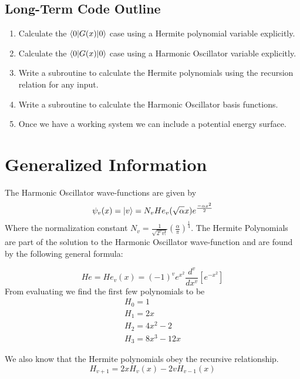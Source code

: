 \documentclass{article}
\begin{document}
 \subsection*{Long-Term Code Outline}
\begin{enumerate}
    \item Calculate the $\braket{0|G(x)|0}$ case using a Hermite polynomial variable explicitly.
    \item Calculate the $\braket{0|G(x)|0}$ case using a Harmonic Oscillator variable explicitly.
    \item Write a subroutine to calculate the Hermite polynomials using the recursion relation for any input. 
    \item Write a subroutine to calculate the Harmonic Oscillator basis functions.
    \item Once we have a working system we can include a potential energy surface. 
\end{enumerate}

\section*{Generalized Information}
The Harmonic Oscillator wave-functions are given by 
\begin{equation}
    \psi_v(x) = \ket{v} = N_vHe_v(\sqrt{\alpha}x)e^{\frac{-\alpha x^2}{2}}
\end{equation}
Where the normalization constant $N_v = \frac{1}{\sqrt{2^vv!}}\left (\frac{\alpha}{\pi}\right )^{\frac{1}{4}}$. 
The Hermite Polynomials are part of the solution to the Harmonic Oscillator wave-function and are found by the following general formula:

\begin{equation}
    He = He_v(x) = (-1)^v e^{x^2}\frac{d^v}{dx^v}\left [ e^{-x^2} \right ]
\end{equation}
From evaluating we find the first few polynomials to be \begin{equation}
    \begin{split}
        H_0 = 1 \\
        H_1 = 2x \\
        H_2 = 4x^2 - 2 \\
        H_3 = 8x^3 - 12x
    \end{split}
\end{equation}

We also know that the Hermite polynomials obey the recursive relationship.
\begin{equation}
    H_{v+1} = 2xH_v(x) - 2vH_{v-1}(x)
\end{equation}
\end{document}
